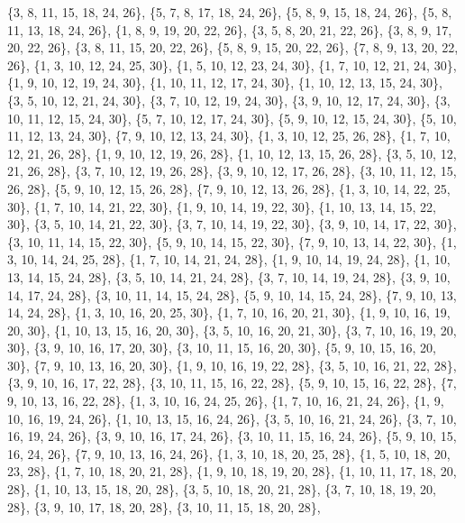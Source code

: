 \documentclass[11pt,a4paper]{article}
\begin{document}
{\{3, 8, 11, 15, 18, 24, 26\}, \{5, 7, 8, 17, 18, 24, 26\}, \{5, 8, 9, 15, 18, 24, 26\}, \{5, 8, 11, 13, 18, 24, 26\}, \{1, 8, 9, 19, 20, 22, 26\},
\{3, 5, 8, 20, 21, 22, 26\}, \{3, 8, 9, 17, 20, 22, 26\}, \{3, 8, 11, 15, 20, 22, 26\}, \{5, 8, 9, 15, 20, 22, 26\}, \{7, 8, 9, 13, 20, 22, 26\},
\{1, 3, 10, 12, 24, 25, 30\}, \{1, 5, 10, 12, 23, 24, 30\}, \{1, 7, 10, 12, 21, 24, 30\}, \{1, 9, 10, 12, 19, 24, 30\}, \{1, 10, 11, 12, 17, 24, 30\},
\{1, 10, 12, 13, 15, 24, 30\}, \{3, 5, 10, 12, 21, 24, 30\}, \{3, 7, 10, 12, 19, 24, 30\}, \{3, 9, 10, 12, 17, 24, 30\}, \{3, 10, 11, 12, 15, 24, 30\},
\{5, 7, 10, 12, 17, 24, 30\}, \{5, 9, 10, 12, 15, 24, 30\}, \{5, 10, 11, 12, 13, 24, 30\}, \{7, 9, 10, 12, 13, 24, 30\}, \{1, 3, 10, 12, 25, 26, 28\},
\{1, 7, 10, 12, 21, 26, 28\}, \{1, 9, 10, 12, 19, 26, 28\}, \{1, 10, 12, 13, 15, 26, 28\}, \{3, 5, 10, 12, 21, 26, 28\}, \{3, 7, 10, 12, 19, 26, 28\},
\{3, 9, 10, 12, 17, 26, 28\}, \{3, 10, 11, 12, 15, 26, 28\}, \{5, 9, 10, 12, 15, 26, 28\}, \{7, 9, 10, 12, 13, 26, 28\}, \{1, 3, 10, 14, 22, 25, 30\},
\{1, 7, 10, 14, 21, 22, 30\}, \{1, 9, 10, 14, 19, 22, 30\}, \{1, 10, 13, 14, 15, 22, 30\}, \{3, 5, 10, 14, 21, 22, 30\}, \{3, 7, 10, 14, 19, 22, 30\},
\{3, 9, 10, 14, 17, 22, 30\}, \{3, 10, 11, 14, 15, 22, 30\}, \{5, 9, 10, 14, 15, 22, 30\}, \{7, 9, 10, 13, 14, 22, 30\}, \{1, 3, 10, 14, 24, 25, 28\},
\{1, 7, 10, 14, 21, 24, 28\}, \{1, 9, 10, 14, 19, 24, 28\}, \{1, 10, 13, 14, 15, 24, 28\}, \{3, 5, 10, 14, 21, 24, 28\}, \{3, 7, 10, 14, 19, 24, 28\},
\{3, 9, 10, 14, 17, 24, 28\}, \{3, 10, 11, 14, 15, 24, 28\}, \{5, 9, 10, 14, 15, 24, 28\}, \{7, 9, 10, 13, 14, 24, 28\}, \{1, 3, 10, 16, 20, 25, 30\},
\{1, 7, 10, 16, 20, 21, 30\}, \{1, 9, 10, 16, 19, 20, 30\}, \{1, 10, 13, 15, 16, 20, 30\}, \{3, 5, 10, 16, 20, 21, 30\}, \{3, 7, 10, 16, 19, 20, 30\},
\{3, 9, 10, 16, 17, 20, 30\}, \{3, 10, 11, 15, 16, 20, 30\}, \{5, 9, 10, 15, 16, 20, 30\}, \{7, 9, 10, 13, 16, 20, 30\}, \{1, 9, 10, 16, 19, 22, 28\},
\{3, 5, 10, 16, 21, 22, 28\}, \{3, 9, 10, 16, 17, 22, 28\}, \{3, 10, 11, 15, 16, 22, 28\}, \{5, 9, 10, 15, 16, 22, 28\}, \{7, 9, 10, 13, 16, 22, 28\},
\{1, 3, 10, 16, 24, 25, 26\}, \{1, 7, 10, 16, 21, 24, 26\}, \{1, 9, 10, 16, 19, 24, 26\}, \{1, 10, 13, 15, 16, 24, 26\}, \{3, 5, 10, 16, 21, 24, 26\},
\{3, 7, 10, 16, 19, 24, 26\}, \{3, 9, 10, 16, 17, 24, 26\}, \{3, 10, 11, 15, 16, 24, 26\}, \{5, 9, 10, 15, 16, 24, 26\}, \{7, 9, 10, 13, 16, 24, 26\},
\{1, 3, 10, 18, 20, 25, 28\}, \{1, 5, 10, 18, 20, 23, 28\}, \{1, 7, 10, 18, 20, 21, 28\}, \{1, 9, 10, 18, 19, 20, 28\}, \{1, 10, 11, 17, 18, 20, 28\},
\{1, 10, 13, 15, 18, 20, 28\}, \{3, 5, 10, 18, 20, 21, 28\}, \{3, 7, 10, 18, 19, 20, 28\}, \{3, 9, 10, 17, 18, 20, 28\}, \{3, 10, 11, 15, 18, 20, 28\},
}
\end{document}
